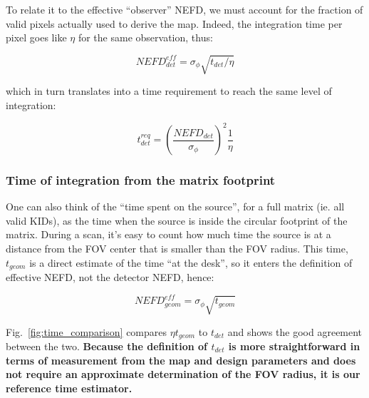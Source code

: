 To relate it to the effective ``observer'' NEFD, we must account for the
fraction of valid pixels actually used to derive the map. Indeed, the
integration time per pixel goes like $\eta$ for the same observation, thus:

\begin{equation}
NEFD_{det}^{eff} = \sigma_\phi\sqrt{t_{det}/\eta}
\end{equation}

which in turn translates into a time requirement to reach the same level of integration:

\begin{equation}
t_{det}^{req} = \left(\frac{NEFD_{det}}{\sigma_\phi}\right)^2\frac{1}{\eta}
\label{eq:t_astro}
\end{equation}

\subsubsection{Time of integration from the matrix footprint}

One can also think of the ``time spent on the source'', for a full matrix
(ie. all valid KIDs), as the time when the source is inside the circular
footprint of the matrix. During a scan, it's easy to count how much time the
source is at a distance from the FOV center that is smaller than the FOV
radius. This time, $t_{geom}$ is a direct estimate of the time ``at the desk'',
so it enters the definition of effective NEFD, not the detector NEFD, hence:

\begin{equation}
NEFD^{eff}_{geom} = \sigma_\phi \sqrt{t_{geom}}
\end{equation}

Fig.~\ref{fig:time_comparison} compares $\eta t_{geom}$ to $t_{det}$ and shows
the good agreement between the two. {\bf Because the definition of $t_{det}$ is more
straightforward in terms of measurement from the map and design parameters and
does not require an approximate determination of the FOV radius, it is our
reference time estimator.}


